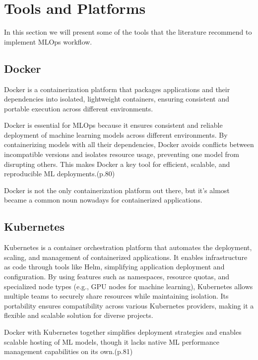 \section{Tools and Platforms}\label{sec:tools}

In this section we will present some of the tools that the literature recommend to implement MLOps workflow.

\subsection{Docker}\label{subsec:docker}
Docker\cite{docker} is a containerization platform that packages applications and their dependencies into isolated,
lightweight containers, ensuring consistent and portable execution across different environments.

Docker is essential for MLOps because it ensures consistent and reliable deployment of machine learning models across different environments.
By containerizing models with all their dependencies, Docker avoids conflicts between incompatible versions and isolates resource usage,
preventing one model from disrupting others.
This makes Docker a key tool for efficient, scalable, and reproducible ML deployments.\cite{treveil2020introducing}(p.80)

Docker is not the only containerization platform out there, but it's almost became a common noun nowadays for containerized applications.

\subsection{Kubernetes}\label{subsec:kubernetes2}

Kubernetes\cite{kubernetes} is a container orchestration platform that automates the deployment, scaling, and management of containerized applications.
It enables infrastructure as code through tools like Helm, simplifying application deployment and configuration.
By using features such as namespaces, resource quotas, and specialized node types (e.g., GPU nodes for machine learning),
Kubernetes allows multiple teams to securely share resources while maintaining isolation.
Its portability ensures compatibility across various Kubernetes providers, making it a flexible and scalable solution for diverse projects.

Docker with Kubernetes together simplifies deployment strategies and enables scalable hosting of ML models,
though it lacks native ML performance management capabilities on its own.\cite{treveil2020introducing}(p.81)

